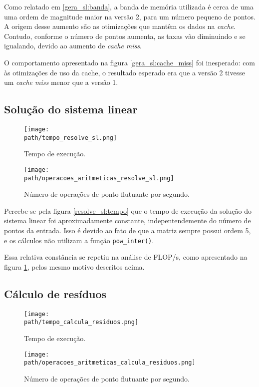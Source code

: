 \documentclass[a4paper, 11pt]{article}
\begin{document}
Como relatado em \ref{gera_sl:banda}, a banda de memória utilizada é cerca de uma
uma ordem de magnitude maior na versão 2, para um número pequeno de pontos. A origem
desse aumento são as otimizações que mantêm os dados na \textit{cache}. Contudo,
conforme o número de pontos aumenta, as taxas vão diminuindo e se igualando, devido
ao aumento de \textit{cache miss}.

O comportamento apresentado na figura \ref{gera_sl:cache_miss} foi inesperado: com
às otimizações de uso da cache, o resultado esperado era que a versão 2 tivesse um
\textit{cache miss} menor que a versão 1.

\subsection{Solução do sistema linear}
\begin{figure}[H]
    \centering
    \begin{minipage}{.5\textwidth}
        \centering
        \texttt{[image: \\path/tempo\_resolve\_sl.png]}
        \caption{Tempo de execução.}
        \label{resolve_sl:tempo}
    \end{minipage}\hfill
    \begin{minipage}{.5\textwidth}
        \centering
        \texttt{[image: \\path/operacoes\_aritmeticas\_resolve\_sl.png]}
        \caption{Número de operações de ponto flutuante por segundo.}
        \label{resolve_sl:flops}
    \end{minipage}
\end{figure}

Percebe-se pela figura \ref{resolve_sl:tempo} que o tempo de execução da
solução do sistema linear foi aproximadamente constante, indepentendemente
do número de pontos da entrada. Isso é devido ao fato de que a matriz sempre
possui ordem 5, e os cálculos não utilizam a função \texttt{pow\_inter()}.

Essa relativa constância se repetiu na análise de FLOP/s, como apresentado na figura
\ref{resolve_sl:flops}, pelos mesmo motivo descritos acima.

\subsection{Cálculo de resíduos}
\begin{figure}[H]
    \centering
    \begin{minipage}{.5\textwidth}
        \centering
        \texttt{[image: \\path/tempo\_calcula\_residuos.png]}
        \caption{Tempo de execução.}
        \label{calcula_residuos:tempo}
    \end{minipage}\hfill
    \begin{minipage}{.5\textwidth}
        \centering
        \texttt{[image: \\path/operacoes\_aritmeticas\_calcula\_residuos.png]}
        \caption{Número de operações de ponto flutuante por segundo.}
        \label{calcula_residuos:flops}
    \end{minipage}
\end{figure}
\end{document}
